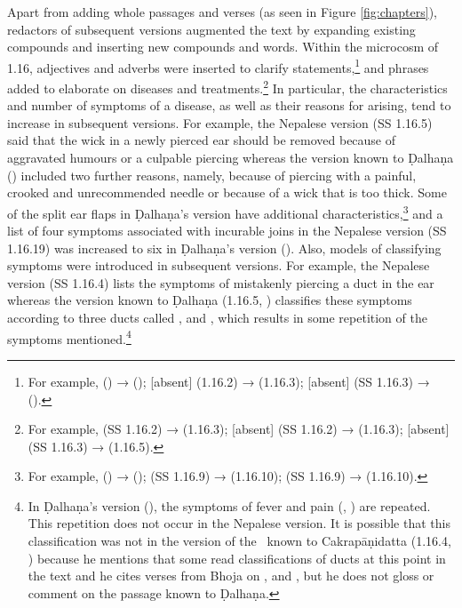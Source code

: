 Apart from adding whole passages and verses (as seen in Figure \ref{fig:chapters}),
redactors of subsequent versions augmented the text by expanding existing
compounds and inserting new compounds and words. Within the microcosm of 1.16,
adjectives and adverbs were inserted to clarify statements,\footnote{For example,
     () → 
    (); [absent] (1.16.2) →  (1.16.3); 
    [absent] (SS 1.16.3) →  ().} and phrases added to
    elaborate on diseases and treatments.\footnote{For example, 
        (SS 1.16.2) →  (1.16.3); [absent] (SS 1.16.2) →
         (1.16.3);  [absent] (SS 1.16.3) →
         (1.16.5).} In particular, the characteristics and
        number of symptoms of a disease, as well as their reasons for arising, tend to
        increase in subsequent versions. For example, the Nepalese version (SS 1.16.5)
        said that the wick in a newly pierced ear should be removed because of aggravated
        humours or a culpable piercing whereas the version known to Ḍalhaṇa 
        () included two further reasons, namely, because of piercing with
        a painful, crooked and unrecommended needle or because of a wick that is too
        thick. Some of the split ear flaps in Ḍalhaṇa's version have additional
        characteristics,\footnote{For example, 
            () →  ();  
            (SS 1.16.9)
            →  (1.16.10); 
            (SS 1.16.9) →  (1.16.10).} and a list of four symptoms
            associated with incurable joins in the Nepalese version (SS 1.16.19) was increased
            to six in Ḍalhaṇa's version (). Also, models of
            classifying symptoms were introduced in subsequent versions. For example, the
            Nepalese version (SS 1.16.4) lists the symptoms of mistakenly piercing a duct in
            the ear whereas the version known to Ḍalhaṇa (1.16.5, \cite[76–77]{vulgate})
            classifies these symptoms according to three ducts called ,
             and , which results in some repetition of the
            symptoms mentioned.\footnote{In Ḍalhaṇa's version  (), 
            the
                symptoms of fever and pain (, ) are repeated. This 
                repetition
                does not occur in the Nepalese version. It is possible that this classification
                was not in the version of the \SS\ known to Cakrapāṇidatta (1.16.4,
                \cite[126]{acar-1939}) because he mentions that some read classifications of ducts
                at this point in the text and he cites verses from Bhoja on ,
                 and , but he does not gloss or comment on the
                passage known to Ḍalhaṇa.}

